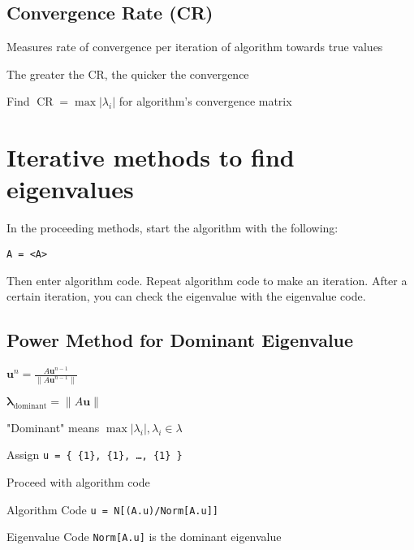 \documentclass[10pt,letterpaper]{article}
\newenvironment{tight_item}
{\begin{itemize}
\setlength{\parskip}{0pt}
\setlength{\parsep}{0pt}
\setlength{\itemsep}{0pt}
\setlength{\parsep}{0pt}
\setlength{\topsep}{0pt}
\setlength{\partopsep}{0pt}
\setlength{\leftmargin}{0em}
\setlength{\labelwidth}{0em}
\setlength{\labelsep}{1em} }
{\end{itemize}}
\newenvironment{tight_enum}
{\begin{enumerate}
\setlength{\parskip}{0pt}
\setlength{\parsep}{0pt}
\setlength{\itemsep}{0pt}
\setlength{\parsep}{0pt}
\setlength{\topsep}{0pt}
\setlength{\partopsep}{0pt}
\setlength{\leftmargin}{0em}
\setlength{\labelwidth}{0em}
\setlength{\labelsep}{1em} }
{\end{enumerate}}
\newenvironment{tight_desc}
{\begin{description}
\setlength{\parskip}{0pt}
\setlength{\parsep}{0pt}
\setlength{\itemsep}{0pt}
\setlength{\parsep}{0pt}
\setlength{\topsep}{0pt}
\setlength{\partopsep}{0pt}
\setlength{\leftmargin}{0em}
\setlength{\labelwidth}{0em}
\setlength{\labelsep}{1em} }
{\end{description}}
\begin{document}
\begin{multicols*}{2}
\subsection{Convergence Rate (CR)}
\begin{tight_item}
\item Measures rate of convergence per iteration of algorithm towards true values
\item The greater the CR, the quicker the convergence
\end{tight_item}
\begin{tight_enum}
\item Find $\operatorname{CR} = \max{|\lambda_{i}|}$ for algorithm's convergence matrix
\end{tight_enum}

\section{Iterative methods to find eigenvalues}
In the proceeding methods, start the algorithm with the following:
\begin{tight_enum}
\item \texttt{A = <A>}
\end{tight_enum}
Then enter algorithm code. Repeat algorithm code to make an iteration. After a
certain iteration, you can check the eigenvalue with the eigenvalue code.

\subsection{Power Method for Dominant Eigenvalue}
\begin{tight_item}
\item $\mathbf{u}^{n} = \frac{A\textbf{u}^{n-1}}{\|A\textbf{u}^{n-1}\|}$
\item $ \mathbf{\lambda}_{\operatorname{dominant}} = \|A\mathbf{u} \| $
\item "Dominant" means $\max{ | \lambda_{i} | }, \lambda_{i} \in \lambda$
\end{tight_item}
\begin{tight_enum}
\item Assign \texttt{u = \{ \{1\}, \{1\}, \ldots, \{1\} \}}
\item Proceed with algorithm code
\end{tight_enum}
\begin{tight_desc}
\item[Algorithm Code]\texttt{u = N[(A.u)/Norm[A.u]]}
\item[Eigenvalue Code] \texttt{Norm[A.u]} is the dominant eigenvalue
\end{tight_desc}



\end{multicols*}
\end{document}
